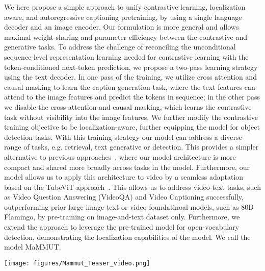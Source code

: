 \documentclass[10pt]{article} \usepackage[accepted]{tmlr}
\newcommand{\ours}{MaMMUT\xspace}
\begin{document}
We here propose a simple approach to unify contrastive learning, localization aware, and autoregressive captioning pretraining, by using a single language decoder and an image encoder.
Our formulation is more general and allows maximal weight-sharing and parameter efficiency between the contrastive and generative tasks. To address the  challenge of reconciling the unconditional sequence-level representation learning needed for contrastive learning with the token-conditioned next-token prediction,  we propose a two-pass learning strategy using the text decoder. In one pass of the training, we utilize cross attention and causal masking to learn the caption generation task, where the text features can attend to the image features and predict the tokens in sequence; in the other pass we disable the cross-attention and causal masking, which learns the contrastive task without visibility into the image features. We further modify the contrastive training objective to be localization-aware, further equipping the model for object detection tasks. With this training strategy our model can address a diverse range of tasks, e.g. retrieval, text generative or detection.
This provides a simpler alternative to previous approaches~\citep{ albef,yu2022coca,singh2022flava,yuan2021florence}, where our model architecture is more compact and shared more broadly across tasks in the model. Furthermore, our model allows us to apply this architecture to video by a seamless adaptation based on the TubeViT approach~\citep{piergiovanni2022tubevit}. This allows us to address video-text tasks, such as Video Question Answering (VideoQA) and Video Captioning successfully,
outperforming prior large image-text or video foundatinoal models, such as 80B Flamingo, by pre-training on image-and-text dataset only.  Furthermore, we extend the approach to leverage the pre-trained model for open-vocabulary detection, demonstrating the localization capabilities of the model.
We call the model \ours.

 
 \begin{figure*}
    \centering
    \vspace{-0.7cm}
   \texttt{[image: figures/Mammut\_Teaser\_video.png]}
    \vspace{-0.1cm}
    \caption{The \ours model is a simple vision-encoder and text-decoder architecture, which serves as foundational model for both image-language and video-language tasks. Despite its relatively small size, the model outperforms SOTA on many diverse tasks. Example results on  Image-Text/Text-Image retrieval, Visual Question Answering (VQA), Open-vocabulary detection, Video Question Answering (VideoQA) are shown. }
    \label{fig:teaser}
    \vspace{-0.5cm}
\end{figure*}
\end{document}
